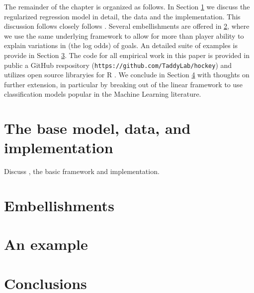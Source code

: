 The remainder of the chapter is organized as follows.  In Section
\ref{sec:base} we discuss the regularized regression model in detail, the data
and the implementation.  This discussion follows closely follows
\cite{gramacy:jensen:taddy:2013}.  Several embellishments are offered in
\ref{sec:embell}, where we use the same underlying framework to allow
for more than player ability to explain variations in (the log odds) of goals.
An detailed suite of examples is provide in Section \ref{sec:example}. The
code for all empirical work in this paper is provided in public a GitHub
respository (\verb!https://github.com/TaddyLab/hockey!) and utilizes open
source libraryies for {\sf R} \cite{cranR}.  We conclude in Section
\ref{sec:conclude} with thoughts on further extension, in particular by
breaking out of the linear framework to use classification models
popular in the Machine Learning literature.



\section{The base model, data, and implementation}
\label{sec:base}

Discuss \cite{gramacy:jensen:taddy:2013}, the basic framework and implementation.


\section{Embellishments}
\label{sec:embell}

\section{An example}
\label{sec:example}

\section{Conclusions}
\label{sec:conclude}


